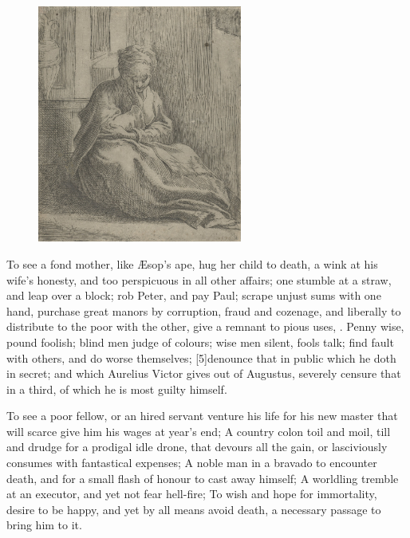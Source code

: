 {\begin{figure}[bh]
  \begingroup
  \centering
  \includegraphics[keepaspectratio,width=0.6\textwidth]{figures/thais-small.jpg}
  \label{fig:thais}
\end{figure}

To see a fond mother, like \AE{}sop's ape, hug her child to death, a 
 wink at his wife's honesty, and too perspicuous in all other
affairs; one stumble at a straw, and leap over a block; rob Peter, and
pay Paul; scrape unjust sums with one hand, purchase great manors by
corruption, fraud and cozenage, and liberally to distribute to the poor
with the other, give a remnant to pious uses, \etc{}. Penny wise, pound
foolish; blind men judge of colours; wise men silent, fools talk; 
find fault with others, and do worse themselves; [5\baselineskip]denounce that in
public which he doth in secret; and which Aurelius Victor gives out of
Augustus, severely censure that in a third, of which he is most guilty
himself.

To see a poor fellow, or an hired servant venture his life for his new
master that will scarce give him his wages at year's end; A country
colon toil and moil, till and drudge for a prodigal idle drone, that
devours all the gain, or lasciviously consumes with fantastical
expenses; A noble man in a bravado to encounter death, and for a small
flash of honour to cast away himself; A worldling tremble at an
executor, and yet not fear hell-fire; To wish and hope for immortality,
desire to be happy, and yet by all means avoid death, a necessary
passage to bring him to it.

}
